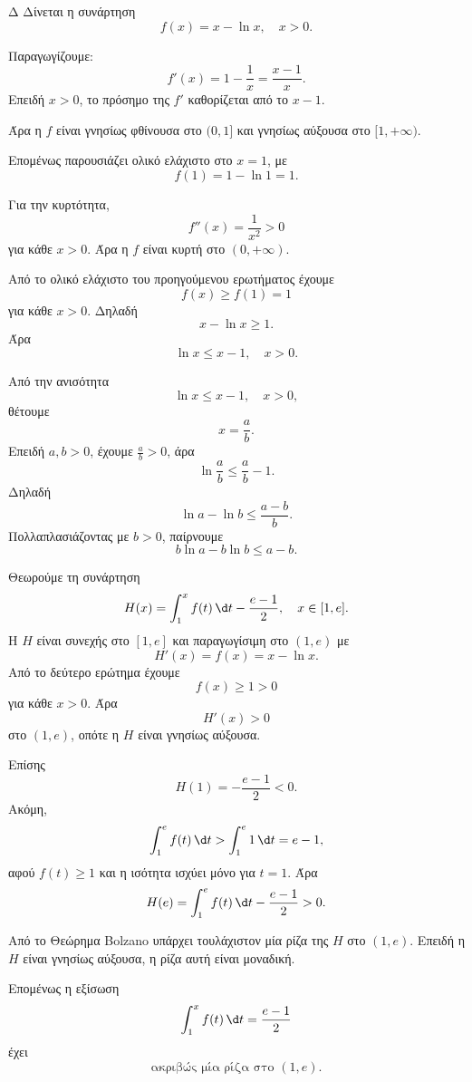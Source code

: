 \begin{thema}{Δ}
Δίνεται η συνάρτηση
\[
f(x)=x-\ln x,\quad x>0.
\]
\begin{erwthma}
\item Παραγωγίζουμε:
\[
f'(x)=1-\frac1x=\frac{x-1}{x}.
\]
Επειδή $x>0$, το πρόσημο της $f'$ καθορίζεται από το $x-1$.

Άρα η $f$ είναι γνησίως φθίνουσα στο $(0,1]$ και γνησίως αύξουσα στο $[1,+\infty)$.

Επομένως παρουσιάζει ολικό ελάχιστο στο $x=1$, με
\[
f(1)=1-\ln1=1.
\]

Για την κυρτότητα,
\[
f''(x)=\frac{1}{x^2}>0
\]
για κάθε $x>0$. Άρα η $f$ είναι κυρτή στο $(0,+\infty)$.

\item Από το ολικό ελάχιστο του προηγούμενου ερωτήματος έχουμε
\[
f(x)\geq f(1)=1
\]
για κάθε $x>0$. Δηλαδή
\[
x-\ln x\geq1.
\]
Άρα
\[
{\ln x\leq x-1,\quad x>0}.
\]

\item Από την ανισότητα
\[
\ln x\leq x-1,\quad x>0,
\]
θέτουμε
\[
x=\frac{a}{b}.
\]
Επειδή $a,b>0$, έχουμε $\frac{a}{b}>0$, άρα
\[
\ln\frac{a}{b}\leq \frac{a}{b}-1.
\]
Δηλαδή
\[
\ln a-\ln b\leq \frac{a-b}{b}.
\]
Πολλαπλασιάζοντας με $b>0$, παίρνουμε
\[
{b\ln a-b\ln b\leq a-b}.
\]

\item Θεωρούμε τη συνάρτηση
\[
H(x)=\dint_1^x f(t)\,\d t-\frac{e-1}{2},\quad x\in[1,e].
\]
Η $H$ είναι συνεχής στο $[1,e]$ και παραγωγίσιμη στο $(1,e)$ με
\[
H'(x)=f(x)=x-\ln x.
\]
Από το δεύτερο ερώτημα έχουμε
\[
f(x)\geq1>0
\]
για κάθε $x>0$. Άρα
\[
H'(x)>0
\]
στο $(1,e)$, οπότε η $H$ είναι γνησίως αύξουσα.

Επίσης
\[
H(1)=-\frac{e-1}{2}<0.
\]
Ακόμη,
\[
\dint_1^e f(t)\,\d t>\dint_1^e 1\,\d t=e-1,
\]
αφού $f(t)\geq1$ και η ισότητα ισχύει μόνο για $t=1$.
Άρα
\[
H(e)=\dint_1^e f(t)\,\d t-\frac{e-1}{2}>0.
\]

Από το Θεώρημα Bolzano υπάρχει τουλάχιστον μία ρίζα της $H$ στο $(1,e)$. Επειδή η $H$ είναι γνησίως αύξουσα, η ρίζα αυτή είναι μοναδική.

Επομένως η εξίσωση
\[
\dint_1^x f(t)\,\d t=\frac{e-1}{2}
\]
έχει
\[
{\text{ακριβώς μία ρίζα στο }(1,e)}.
\]
\end{erwthma}
\end{thema}
